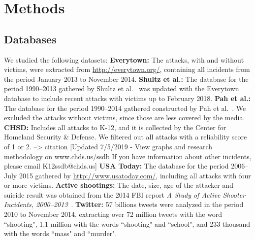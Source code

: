 \section*{Methods}

\subsection*{Databases}
We studied the following datasets:
\textbf{Everytown:} The attacks, with and without victims, were extracted from \url{http://everytown.org/}, containing all incidents from the period January 2013 to November 2014.
\textbf{Shultz et al.:} The database for the period 1990--2013 gathered by Shultz et al.~\cite{Shultz2013} was updated with the Everytown database to include recent attacks with victims up to February 2018.
\textbf{Pah et al.:} The database for the period 1990--2014 gathered constructed by Pah et al.~\cite{Pah2017}. We excluded the attacks without victims, since those are less covered by the media.
\textbf{CHSD:} Includes all attacks to K-12, and it is collected by the Center for Homeland Security & Defense. We filtered out all attacks with a reliability score of 1 or 2. --> citation [Updated 7/5/2019 - View graphs and research methodology on www.chds.us/ssdb If you have information about other incidents, please email K12ssdb@chds.us]
\textbf{USA Today:} The database for the period 2006--July 2015 gathered by \url{http://www.usatoday.com/},  including all attacks with four or more victims.
\textbf{Active shootings:} The date, size, age of the attacker and suicide result was obtained from the 2014 FBI report \textit{A Study of Active Shooter Incidents, 2000--2013}~\cite{FBI}.
\textbf{Twitter:} 57 billions tweets were analyzed in the period 2010 to November 2014, extracting over 72 million tweets with the word ``shooting", 1.1 million with the words ``shooting" and ``school", and 233 thousand with the words ``mass" and ``murder". 
 
